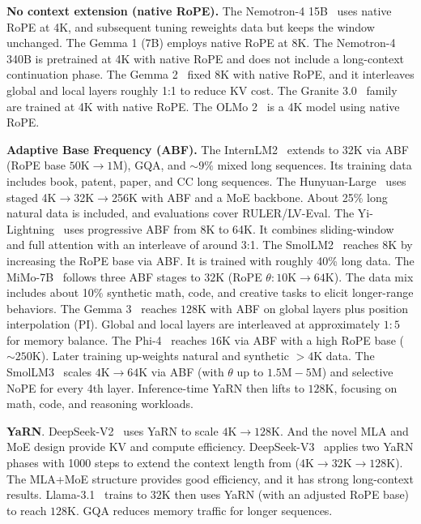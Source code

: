 \medskip

\noindent\textbf{No context extension (native RoPE).} 
The Nemotron-4 15B~\cite{parmar2024nemotron} uses native RoPE at 4K, and subsequent tuning reweights data but keeps the window unchanged. 
The Gemma 1 (7B) employs native RoPE at 8K. 
The Nemotron-4 340B is pretrained at 4K with native RoPE and does not include a long-context continuation phase. 
The Gemma 2~\cite{team2024gemma} fixed 8K with native RoPE, and it interleaves global and local layers roughly 1{:}1 to reduce KV cost.
The Granite 3.0~\cite{granite2024granite} family are trained at 4K with native RoPE. 
The OLMo 2~\cite{olmo20242} is a 4K model using native RoPE. 

\medskip

\noindent\textbf{Adaptive Base Frequency (ABF).}
The InternLM2~\cite{cai2024internlm2} extends to 32K via ABF~\cite{xiong2023effective} (RoPE base $50\mathrm{K}\!\to\!1\mathrm{M}$), GQA, and $\sim9\%$ mixed long sequences. Its training data includes book, patent, paper, and CC long sequences.
The Hunyuan-Large~\cite{sun2024hunyuan} uses staged 4K$\to$32K$\to$256K with ABF and a MoE backbone. About 25\% long natural data is included, and evaluations cover RULER/LV-Eval.
The Yi-Lightning~\cite{wake2024yi} uses progressive ABF from 8K to 64K. It combines sliding-window and full attention with an interleave of around 3{:}1.
The SmolLM2~\cite{allal2025smollm2} reaches 8K by increasing the RoPE base via ABF. It is trained with roughly 40\% long data.
The MiMo-7B~\cite{xiaomi2025mimo} follows three ABF stages to $32\mathrm{K}$ (RoPE $\theta:10\mathrm{K}\!\to\!64\mathrm{K}$). The data mix includes about 10\% synthetic math, code, and creative tasks to elicit longer-range behaviors.
The Gemma 3~\cite{team2025gemma} reaches $128\mathrm{K}$ with ABF on global layers plus position interpolation (PI). Global and local layers are interleaved at approximately $1{:}5$ for memory balance.
The Phi-4~\cite{abdin2024phi} reaches $16\mathrm{K}$ via ABF with a high RoPE base ($\sim\!250\mathrm{K}$). Later training up-weights natural and synthetic $>\!4\mathrm{K}$ data.
The SmolLM3~\cite{bakouch2025smollm3} scales $4\mathrm{K}\!\to\!64\mathrm{K}$ via ABF (with $\theta$ up to $1.5\mathrm{M}\!-\!5\mathrm{M}$) and selective NoPE for every 4th layer. Inference-time YaRN then lifts to $128\mathrm{K}$, focusing on math, code, and reasoning workloads. 

\medskip

\noindent\textbf{YaRN}.
DeepSeek-V2~\cite{liu2024deepseek} uses YaRN to scale $4\mathrm{K}\!\to\!128\mathrm{K}$. And the novel MLA and MoE design provide KV and compute efficiency.
DeepSeek-V3~\cite{DeepSeekAI2024DeepSeekV3TR} applies two YaRN phases with 1000 steps to extend the context length from ($4\mathrm{K}\!\to\!32\mathrm{K}\!\to\!128\mathrm{K}$). The MLA{+}MoE structure provides good efficiency, and it has strong long-context results.
Llama-3.1~\cite{Dubey2024TheL3} trains to $32\mathrm{K}$ then uses YaRN (with an adjusted RoPE base) to reach $128\mathrm{K}$. GQA reduces memory traffic for longer sequences.

